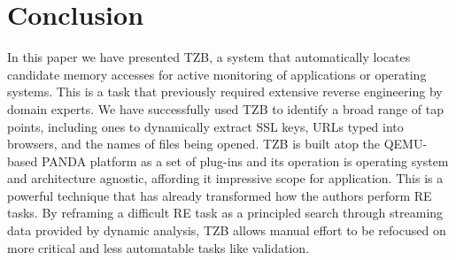 \section{Conclusion}
\label{sec:conclusion}

In this paper we have presented TZB, a system that automatically locates
candidate memory accesses for active monitoring of applications or operating
systems. This is a task that previously required extensive reverse engineering
by domain experts. We have successfully used TZB to identify a broad range of
tap points, including ones to dynamically extract SSL keys, URLs typed into
browsers, and the names of files being opened. TZB is built atop the QEMU-based
PANDA platform as a set of plug-ins and its operation is operating system and
architecture agnostic, affording it impressive scope for application. This is a
powerful technique that has already transformed how the authors perform RE
tasks. By reframing a difficult RE task as a principled search through streaming
data provided by dynamic analysis, TZB allows manual effort to be refocused on
more critical and less automatable tasks like validation.

